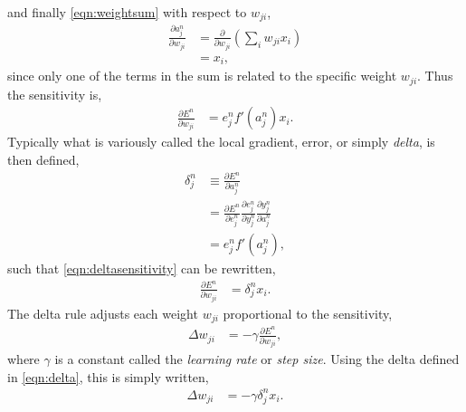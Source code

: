 \documentclass[thesis]{subfiles}
\begin{document}
%
and finally \cref{eqn:weightsum} with respect to $w_{ji}$,
\begin{equation}
\begin{aligned}
   \frac{\partial a^n_j}{\partial w_{ji}} &= \frac{\partial}{\partial w_{ji}} \left( \sum_i w_{ji} x_{i} \right)\\
   &= x_i,
\end{aligned}
\label{eqn:sumonetermpartial}
\end{equation}
since only one of the terms in the sum is related to the specific weight $w_{ji}$. Thus the sensitivity is,
\begin{equation}
\label{eqn:deltasensitivity}
\begin{aligned}
    \frac{\partial E^n}{\partial w_{ji}} &= e^n_j  f'\left( a^n_j \right) x_i.
\end{aligned}
\end{equation}
%
Typically what is variously called the local gradient, error, or simply \emph{delta}, is then defined,
\begin{equation}
\label{eqn:delta}
\begin{aligned}
    \delta^n_j &\equiv \frac{\partial E^n}{\partial a^n_j}\\
    &= \frac{\partial E^n}{\partial e^n_j}\frac{\partial e^n_j}{\partial y^n_j} \frac{\partial y^n_j}{\partial a^n_j}\\
    &= e^n_j  f'\left( a^n_j \right),
\end{aligned}
\end{equation}
%
such that \cref{eqn:deltasensitivity} can be rewritten,
\begin{equation}
\begin{aligned}
    \frac{\partial E^n}{\partial w_{ji}} &= \delta^n_j x_i.
\end{aligned}
\end{equation}
%
The delta rule adjusts each weight $w_{ji}$ proportional to the sensitivity, 
\begin{equation}
\begin{aligned}
    \Delta w_{ji} &= -\gamma \frac{\partial E^n}{\partial w_{ji}},
\end{aligned}
\end{equation}
%
where $\gamma$ is a constant called the \emph{learning rate} or \emph{step size}. Using the delta defined in \cref{eqn:delta}, this is simply written,
\begin{equation}
\begin{aligned}
    \Delta w_{ji} &= -\gamma \delta^n_j x_i.
\end{aligned}
\end{equation}
%
\end{document}
